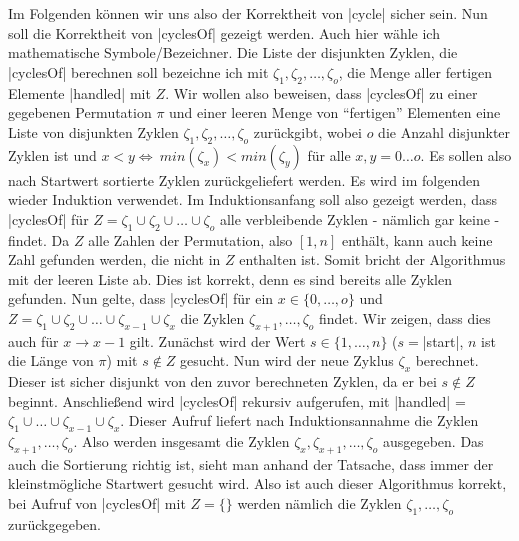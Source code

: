 Im Folgenden können wir uns also der Korrektheit von |cycle| sicher sein. Nun soll die Korrektheit von |cyclesOf| gezeigt werden.
Auch hier wähle ich mathematische Symbole/Bezeichner.
Die Liste der disjunkten Zyklen, die |cyclesOf| berechnen soll bezeichne ich mit $\zeta_1, \zeta_2, \dots, \zeta_o$, die Menge aller fertigen Elemente |handled| mit $Z$.
Wir wollen also beweisen, dass |cyclesOf| zu einer gegebenen Permutation $\pi$ und einer leeren Menge von ``fertigen'' Elementen eine Liste
von disjunkten Zyklen $\zeta_1, \zeta_2, \dots, \zeta_o$ zurückgibt, wobei $o$ die Anzahl disjunkter Zyklen ist und $x < y \Leftrightarrow \ min(\zeta_x) < min(\zeta_y)$ für alle $x,y=0 \dots o$.
Es sollen also nach Startwert sortierte Zyklen zurückgeliefert werden.
Es wird im folgenden wieder Induktion verwendet.
Im Induktionsanfang soll also gezeigt werden, dass |cyclesOf| für $Z = \zeta_1 \cup \zeta_2 \cup \dots \cup \zeta_o$ alle verbleibende Zyklen - nämlich gar keine - findet.
Da $Z$ alle Zahlen der Permutation, also $[1,n]$ enthält, kann auch keine Zahl gefunden werden, die nicht in $Z$ enthalten ist. Somit bricht der Algorithmus mit der leeren Liste ab.
Dies ist korrekt, denn es sind bereits alle Zyklen gefunden.
Nun gelte, dass |cyclesOf| für ein $x \in \{0, \dots, o\}$ und $Z = \zeta_1 \cup \zeta_2 \cup \dots \cup \zeta_{x-1} \cup \zeta_x$ die Zyklen $\zeta_{x+1}, \dots, \zeta_o$ findet.
Wir zeigen, dass dies auch für $x \rightarrow x-1$ gilt.
Zunächst wird der Wert $s \in \{1, \dots, n\}$ ($s=$|start|, $n$ ist die Länge von $\pi$) mit $s \notin Z$ gesucht.
Nun wird der neue Zyklus $\zeta_x$ berechnet. Dieser ist sicher disjunkt von den zuvor berechneten Zyklen, da er bei $s \notin Z$ beginnt.
Anschließend wird |cyclesOf| rekursiv aufgerufen, mit |handled| = $\zeta_1 \cup \dots \cup \zeta_{x-1} \cup \zeta_{x}$.
Dieser Aufruf liefert nach Induktionsannahme die Zyklen $\zeta_{x+1}, \dots, \zeta_o$.
Also werden insgesamt die Zyklen $\zeta_{x}, \zeta_{x+1}, \dots, \zeta_o$ ausgegeben.
Das auch die Sortierung richtig ist, sieht man anhand der Tatsache, dass immer der kleinstmögliche Startwert gesucht wird.
Also ist auch dieser Algorithmus korrekt, bei Aufruf von |cyclesOf| mit $Z = \{\}$ werden nämlich die Zyklen $\zeta_1, \dots, \zeta_o$ zurückgegeben.\\

